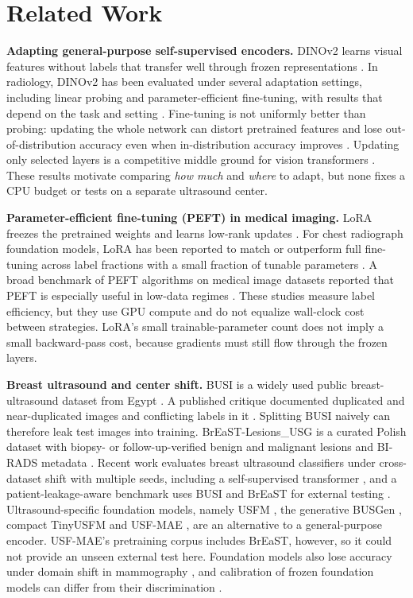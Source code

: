 \documentclass[conference,a4paper]{IEEEtran}
\begin{document}
\section{Related Work}
\label{sec:related}

\textbf{Adapting general-purpose self-supervised encoders.} DINOv2 learns visual
features without labels that transfer well through frozen representations
\cite{oquab2024dinov2}. In radiology, DINOv2 has been evaluated under several
adaptation settings, including linear probing and parameter-efficient
fine-tuning, with results that depend on the task and setting
\cite{baharoon2023radiology}. Fine-tuning is not uniformly better than probing:
updating the whole network can distort pretrained features and lose
out-of-distribution accuracy even when in-distribution accuracy improves
\cite{kumar2022distortion}. Updating only selected layers is a competitive
middle ground for vision transformers \cite{ye2023partial}. These results
motivate comparing \emph{how much} and \emph{where} to adapt, but none fixes a
CPU budget or tests on a separate ultrasound center.

\textbf{Parameter-efficient fine-tuning (PEFT) in medical imaging.} LoRA freezes
the pretrained weights and learns low-rank updates \cite{hu2021lora}. For chest
radiograph foundation models, LoRA has been reported to match or outperform full
fine-tuning across label fractions with a small fraction of tunable parameters
\cite{lian2024less}. A broad benchmark of PEFT algorithms on medical image
datasets reported that PEFT is especially useful in low-data regimes
\cite{dutt2024missed}. These studies measure label efficiency, but they use GPU
compute and do not equalize wall-clock cost between strategies. LoRA's small
trainable-parameter count does not imply a small backward-pass cost, because
gradients must still flow through the frozen layers.

\textbf{Breast ultrasound and center shift.} BUSI is a widely used public
breast-ultrasound dataset from Egypt \cite{aldhabyani2020busi}. A published
critique documented duplicated and near-duplicated images and conflicting labels
in it \cite{pawlowska2023critique}. Splitting BUSI naively can therefore leak
test images into training. BrEaST-Lesions\_USG is a curated Polish dataset with
biopsy- or follow-up-verified benign and malignant lesions and BI-RADS metadata
\cite{pawlowska2024breast,pawlowska2024tciadata}. Recent work evaluates breast
ultrasound classifiers under cross-dataset shift with multiple seeds, including
a self-supervised transformer \cite{ramollari2026shift}, and a
patient-leakage-aware benchmark uses BUSI and BrEaST for external testing
\cite{wang2026datasetshift}. Ultrasound-specific foundation models, namely USFM
\cite{jiao2024usfm}, the generative BUSGen \cite{yu2026busgen}, compact TinyUSFM
\cite{ma2026tinyusfm} and USF-MAE \cite{megahed2025usfmae}, are an alternative to
a general-purpose encoder. USF-MAE's pretraining corpus includes BrEaST,
however, so it could not provide an unseen external test here. Foundation models
also lose accuracy under domain shift in mammography \cite{nguyen2026shift}, and
calibration of frozen foundation models can differ from their discrimination
\cite{poyrazer2026calibration,guo2017calibration}.
\end{document}
